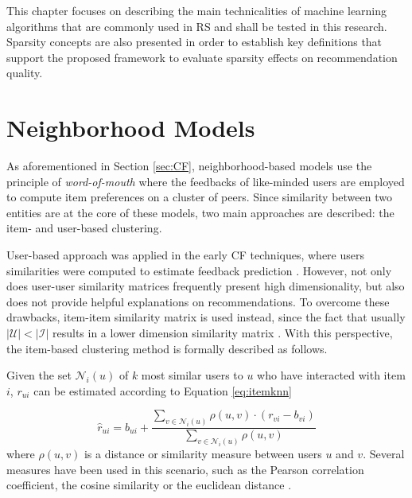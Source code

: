 This chapter focuses on describing the main technicalities of machine learning algorithms that are commonly used in RS and shall be tested in this research. Sparsity concepts are also presented in order to establish key definitions that support the proposed framework to evaluate sparsity effects on recommendation quality.

\section{Neighborhood Models}

As aforementioned in Section \ref{sec:CF}, neighborhood-based models use the principle of \textit{word-of-mouth} where the feedbacks of like-minded users are employed to compute item preferences on a cluster of peers. Since similarity between two entities are at the core of these models, two main approaches are described: the item- and user-based clustering.

User-based approach was applied in the early CF techniques, where users similarities were computed to estimate feedback prediction \cite{1999AlgorithmicFramework}. However, not only does user-user similarity matrices frequently present high dimensionality, but also does not provide helpful explanations on recommendations. To overcome these drawbacks, item-item similarity matrix is used instead, since the fact that usually $|\mathcal{U}| < |\mathcal{I}|$ results in a lower dimension similarity matrix \cite{2001sarwar}. With this perspective, the item-based clustering method is formally described as follows.

Given the set $\mathcal{N}_i(u)$ of $k$ most similar users to $u$ who have interacted with item $i$, $r_{ui}$ can be estimated according to Equation \ref{eq:itemknn}

\begin{equation} 
    \label{eq:itemknn}
    \hat{r}_{ui} = b_{ui} + \frac{\sum_{v \in \mathcal{N}_i(u)} \rho(u,v)\cdot (r_{vi}-b_{vi})}{\sum_{v \in \mathcal{N}_i(u)} \rho(u,v)}
\end{equation} where $\rho(u,v)$ is a distance or similarity measure between users $u$ and $v$. Several  measures have been used in this scenario, such as the Pearson correlation coefficient, the cosine similarity or the euclidean distance \cite{2010Handbook, 10.1145/3133264.3133299}.




